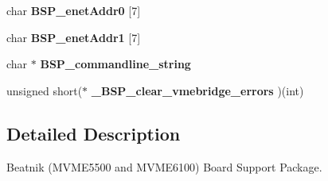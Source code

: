 \begin{DoxyCompactItemize}
char {\bfseries B\+S\+P\+\_\+enet\+Addr0} \mbox{[}7\mbox{]}
\item 
\mbox{\label{group__RTEMSBSPsPowerPCBeatnik_ga333bb5aa6b2ece00eac1344640ac0b89}} 
char {\bfseries B\+S\+P\+\_\+enet\+Addr1} \mbox{[}7\mbox{]}
\item 
\mbox{\label{group__RTEMSBSPsPowerPCBeatnik_ga100176343d992cefc1dda54c21c9abc3}} 
char $\ast$ {\bfseries B\+S\+P\+\_\+commandline\+\_\+string}
\item 
\mbox{\label{group__RTEMSBSPsPowerPCBeatnik_ga20df3083228c9326ff30e2c7953be414}} 
unsigned short($\ast$ {\bfseries \+\_\+\+B\+S\+P\+\_\+clear\+\_\+vmebridge\+\_\+errors} )(int)
\end{DoxyCompactItemize}


\subsection{Detailed Description}
Beatnik (M\+V\+M\+E5500 and M\+V\+M\+E6100) Board Support Package. 

